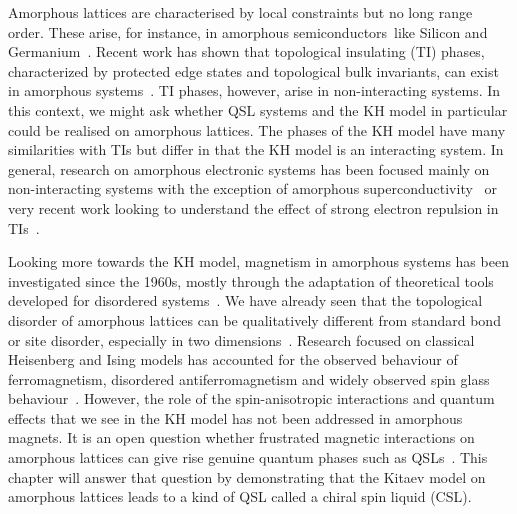 Amorphous lattices are characterised by local constraints but no long range order. These arise, for instance, in amorphous semiconductors~like Silicon and Germanium~\autocite{Yonezawa1983,zallen2008physics}. Recent work has shown that topological insulating (TI) phases, characterized by protected edge states and topological bulk invariants, can exist in amorphous systems~\autocite{mitchellAmorphousTopologicalInsulators2018,agarwala2019topological,marsalTopologicalWeaireThorpeModels2020,costa2019toward,agarwala2020higher,spring2021amorphous,corbae2019evidence}. TI phases, however, arise in non-interacting systems. In this context, we might ask whether QSL systems and the KH model in particular could be realised on amorphous lattices. The phases of the KH model have many similarities with TIs but differ in that the KH model is an interacting system. In general, research on amorphous electronic systems has been focused mainly on non-interacting systems with the exception of amorphous superconductivity~\autocite{buckel1954einfluss,mcmillan1981electron,meisel1981eliashberg,bergmann1976amorphous,mannaNoncrystallineTopologicalSuperconductors2022} or very recent work looking to understand the effect of strong electron repulsion in TIs~\autocite{kim2022fractionalization}.

Looking more towards the KH model, magnetism in amorphous systems has been investigated since the 1960s, mostly through the adaptation of theoretical tools developed for disordered systems~\autocite{aharony1975critical,Petrakovski1981,kaneyoshi1992introduction,Kaneyoshi2018}. We have already seen that the topological disorder of amorphous lattices can be qualitatively different from standard bond or site disorder, especially in two dimensions~\autocite{barghathiPhaseTransitionsRandom2014,schrauthViolationHarrisBarghathiVojtaCriterion2018}. Research focused on classical Heisenberg and Ising models has accounted for the observed behaviour of ferromagnetism, disordered antiferromagnetism and widely observed spin glass behaviour~\autocite{coey1978amorphous}. However, the role of the spin-anisotropic interactions and quantum effects that we see in the KH model has not been addressed in amorphous magnets. It is an open question whether frustrated magnetic interactions on amorphous lattices can give rise genuine quantum phases such as QSLs~\autocite{Anderson1973,Knolle2019,Savary2016,Lacroix2011}. This chapter will answer that question by demonstrating that the Kitaev model on amorphous lattices leads to a kind of QSL called a chiral spin liquid (CSL).

